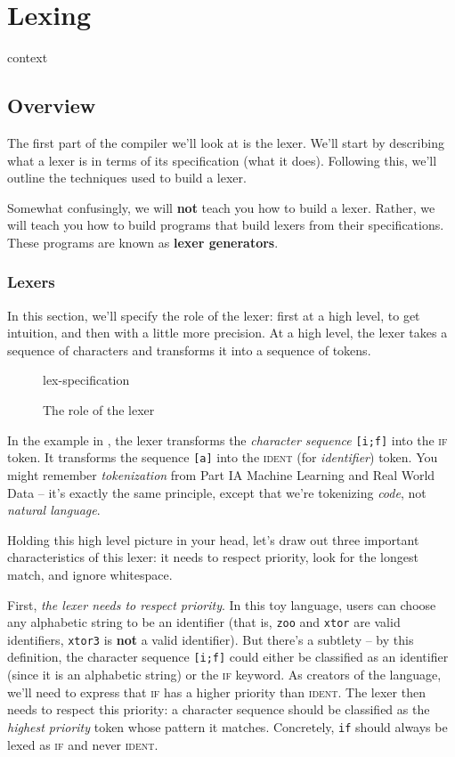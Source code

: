 \chapter{Lexing}

\begin{center}
{context}
\end{center}

\section{Overview}
The first part of the compiler we'll look at is the lexer. We'll start by describing what a lexer is in terms of its specification (what it does). Following this, we'll outline the techniques used to build a lexer.

Somewhat confusingly, we will \textbf{not} teach you how to build a lexer. Rather, we will teach you how to build programs that build lexers from their specifications. These programs are known as \textbf{lexer generators}.

\subsection{Lexers}
In this section, we'll specify the role of the lexer: first at a high level, to get intuition, and then with a little more precision. At a high level, the lexer takes a sequence of characters and transforms it into a sequence of tokens.  

\begin{figure}[H]
\centering
{lex-specification}
\caption{The role of the lexer}
\label{fig:lex-specification}
\end{figure}

In the example in , the lexer transforms the \emph{character sequence} \texttt{[i;f]} into the \textsc{if} token. It transforms the sequence \texttt{[a]} into the \textsc{ident} (for \emph{identifier}) token. You might remember \emph{tokenization} from {\sffamily Part IA Machine Learning and Real World Data} -- it's exactly the same principle, except that we're tokenizing \textit{code}, not \textit{natural language}. 

Holding this high level picture in your head, let's draw out three important characteristics of this lexer: it needs to respect priority, look for the longest match, and ignore whitespace.

First, \emph{the lexer needs to respect priority}. In this toy language, users can choose any alphabetic string to be an identifier (that is, \texttt{zoo} and \texttt{xtor} are valid identifiers, \texttt{xtor3} is \textbf{not} a valid identifier). But there's a subtlety -- by this definition, the character sequence \texttt{[i;f]} could either be classified as an identifier (since it is an alphabetic string) or the \textsc{if} keyword. As creators of the language, we'll need to express that \textsc{if} has a higher priority than \textsc{ident}. The lexer then needs to respect this priority: a character sequence should be classified as the \textit{highest priority} token whose pattern it matches. Concretely, \texttt{if} should always be lexed as \textsc{if} and never \textsc{ident}. 

